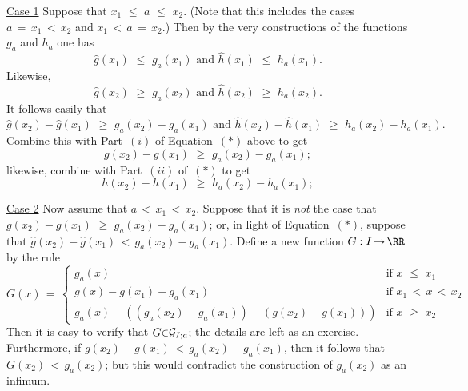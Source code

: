         \h \underline{Case 1} Suppose that $x_{1}\,\,{\leq}\,\,a\,\,{\leq}\,\,x_{2}$.
    (Note that this includes the cases $a \,=\, x_{1}\,<\,x_{2}$ and $x_{1}\,<\,a \,=\, x_{2}$.)
    Then by the very constructions of the functions $g_{a}$ and $h_{a}$ one has
        \begin{displaymath}
        \hat{g}(x_{1})\,\,{\leq}\,\,g_{a}(x_{1}) \mbox{ and } \hat{h}(x_{1})\,\,{\leq}\,\,h_{a}(x_{1}).
        \end{displaymath}
    Likewise,
        \begin{displaymath}
        \hat{g}(x_{2})\,\,{\geq}\,\,g_{a}(x_{2}) \mbox{ and } \hat{h}(x_{2})\,\,{\geq}\,\,h_{a}(x_{2}).
        \end{displaymath}
    It follows easily that
        \begin{displaymath}
        \hat{g}(x_{2}) - \hat{g}(x_{1})\,\,{\geq}\,\,g_{a}(x_{2}) - g_{a}(x_{1}) \mbox{ and } \hat{h}(x_{2}) - \hat{h}(x_{1})\,\,{\geq}\,\,h_{a}(x_{2}) - h_{a}(x_{1}).
        \end{displaymath}
    Combine this with Part~$(i)$ of Equation~$({\ast})$ above to get
        \begin{displaymath}
        g(x_{2}) - g(x_{1})\,\,{\geq}\,\,g_{a}(x_{2})-g_{a}(x_{1});
        \end{displaymath}
    likewise, combine with Part~$(ii)$ of~$({\ast})$ to get
        \begin{displaymath}
        h(x_{2}) - h(x_{1})\,\,{\geq}\,\,h_{a}(x_{2})-h_{a}(x_{1});
        \end{displaymath}


        \underline{Case 2} Now assume that $a\,<\,x_{1}\,<\,x_{2}$. Suppose that it is {\em not} the case that $g(x_{2})-g(x_{1})\,\,{\geq}\,\,g_{a}(x_{2}) - g_{a}(x_{1})$;
    or, in light of Equation~$({\ast})$, suppose that $\hat{g}(x_{2})-\hat{g}(x_{1})\,<\,g_{a}(x_{2}) - g_{a}(x_{1})$.
    Define a new function $G:I \,{\rightarrow}\, {\RR}$ by the rule
        \begin{displaymath}
        G(x) \,=\, \left\{
        \begin{array}{ll}
        g_{a}(x)   & \mbox{if $x\,\,{\leq}\,\,x_{1}$} \\
        g(x) - g(x_{1}) + g_{a}(x_{1}) & \mbox{if $x_{1}\,<\,x\,<\,x_{2}$} \\
        g_{a}(x) - \left((g_{a}(x_{2}) - g_{a}(x_{1})) - (g(x_{2})-g(x_{1}))\right)   & \mbox{if $x\,\,{\geq}\,\,x_{2}$}
        \end{array}
        \right.
        \end{displaymath}
    Then it is easy to verify that $G{\in}{\cal G}_{I;a}$; the details are left as an exercise.
    Furthermore, if $g(x_{2}) - g(x_{1})\,<\,g_{a}(x_{2}) - g_{a}(x_{1})$, then it follows that $G(x_{2})\,<\,g_{a}(x_{2})$; but this would contradict the construction of $g_{a}(x_{2})$ as an infimum.

